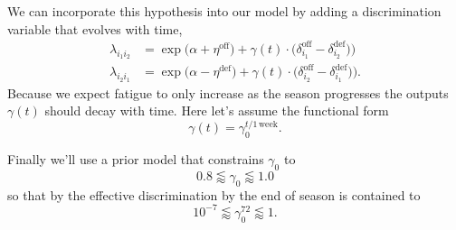 \documentclass[
  letterpaper,
  DIV=11,
  numbers=noendperiod]{scrartcl}
\begin{document}
We can incorporate this hypothesis into our model by adding a
discrimination variable that evolves with time, \begin{align*}
\lambda_{i_{1} i_{2}}
&=
\exp \big(   \alpha + \eta^{\mathrm{off}} \big)
           + \gamma(t) \cdot
               \big(  \delta_{i_{1}}^{\mathrm{off}}
                    - \delta_{i_{2}}^{\mathrm{def}} \big)
     \big)
\\
\lambda_{i_{2} i_{1}}
&=
\exp \big(   \alpha - \eta^{\mathrm{def}} \big)
           + \gamma(t) \cdot
               \big(  \delta_{i_{2}}^{\mathrm{off}}
                    - \delta_{i_{1}}^{\mathrm{def}} \big)
     \big).
\end{align*} Because we expect fatigue to only increase as the season
progresses the outputs \(\gamma(t)\) should decay with time. Here let's
assume the functional form \[
\gamma(t) = \gamma_{0}^{t / 1 \, \mathrm{week} }.
\]

Finally we'll use a prior model that constrains \(\gamma_{0}\) to \[
0.8 \lessapprox \gamma_{0} \lessapprox 1.0
\] so that by the effective discrimination by the end of season is
contained to \[
10^{-7} \lessapprox \gamma_{0}^{72} \lessapprox 1.
\]
\end{document}
